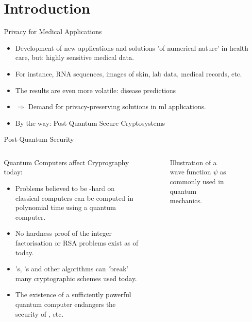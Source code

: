 \section{Introduction}
\begin{frame}{Privacy for Medical Applications}
  \begin{itemize}
    \item Development of new applications and solutions 'of numerical nature' in health care, but: highly sensitive medical data.
    \item For instance, RNA sequences, images of skin, lab data, medical records, etc.
    \item The results are even more volatile: disease predictions
    \item $\Rightarrow$ Demand for privacy-preserving solutions in \gls{ml} applications.
    \item By the way: Post-Quantum Secure Cryptosystems
  \end{itemize}
\end{frame}

\begin{frame}{Post-Quantum Security}
  \begin{columns}
    \begin{column}{0.6\linewidth}
      Quantum Computers affect Cryprography today:
      \begin{itemize}
        \item Problems believed to be -hard on classical computers can be computed in polynomial time using a quantum computer.
        \item No hardness proof of the integer factorisation or RSA problems exist as of today.
        \item {}'s, 's and other algorithms can 'break' many cryptographic schemes used today.
        \item The existence of a sufficiently powerful quantum computer endangers the security of , etc.
      \end{itemize}
    \end{column}
    \begin{column}{0.4\linewidth}
      \vspace{-0.3cm}
      \begin{figure}[H]
        \centering
        \caption{Illustration of a wave function $\psi$ as commonly used in quantum mechanics.}
        \label{fig:wave-function}
      \end{figure}
    \end{column}
  \end{columns}
\end{frame}

